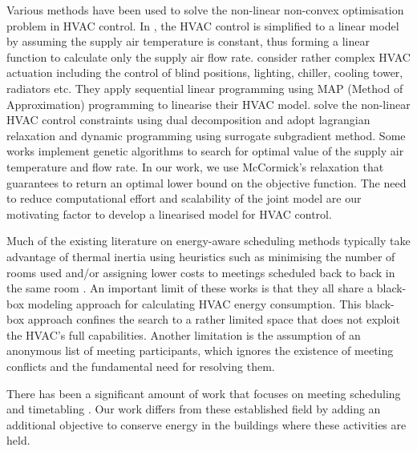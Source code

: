 Various methods have been used to solve the non-linear non-convex optimisation problem in HVAC control. In \cite{klein2012coordinating}, the HVAC control is simplified to a linear model by assuming the supply air temperature is constant, thus forming a linear function to calculate only the supply air flow rate. \cite{oldewurtel2013importance} consider rather complex HVAC actuation including the control of blind positions, lighting, chiller, cooling tower, radiators etc. They apply sequential linear programming using MAP (Method of Approximation) programming \citep{griffith1961nonlinear} to linearise their HVAC model. \cite{ma2011distributed} solve the non-linear HVAC control constraints using dual decomposition and \cite{sun2010integrated} adopt lagrangian relaxation and dynamic programming using surrogate subgradient method. Some works \citep{wang2000model, xu2009model, mossolly2009optimal} implement genetic algorithms to search for optimal value of the supply air temperature and flow rate. In our work, we use McCormick's relaxation that guarantees to return an optimal lower bound on the objective function. The need to reduce computational effort and scalability of the joint model are our motivating factor to develop a linearised model for HVAC control. 

Much of the existing literature on energy-aware scheduling methods typically take advantage of thermal inertia using heuristics such as minimising the number of rooms used and/or assigning lower costs to meetings scheduled back to back in the same room \citep{pan2012thermal,kwak2013tesla,majumdar2012energy,chai2014minimizing}. An important limit of these works is that they all share a black-box modeling approach for calculating HVAC energy consumption. This black-box approach confines the search to a rather limited space that does not exploit the HVAC's full capabilities. Another limitation is the assumption of an anonymous list of meeting participants, which ignores the existence of meeting conflicts and the fundamental need for resolving them. 

There has been a significant amount of work that focuses on meeting scheduling \citep{modi2004multiagent,refanidis2010constraint,tran2016smart} and timetabling \citep{merlot2002hybrid,di2002multi,abdullah2007tabu}. Our work differs from these established field by adding an additional objective to conserve energy in the buildings where these activities are held. 

